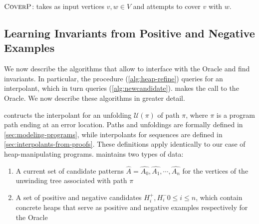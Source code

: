 \begin{algorithm}[ht]


  \caption{$\textsc{CoverP}$: takes as input vertices $v, w \in V$ and attempts to cover $v$ with $w$.}
  \label{alg:heap-cover}
\end{algorithm}

\subsection*{Learning Invariants from Positive and Negative Examples}

We now describe the algorithms that allow \verifier to interface with the Oracle and find invariants. In particular, the  procedure (\autoref{alg:heap-refine}) queries \seplearner for an interpolant, which in turn queries \newcandidate (\autoref{alg:newcandidate}). \newcandidate makes the call to the Oracle. We now describe these algorithms in greater detail.

\seplearner contructs the interpolant for an unfolding $\mathcal{U}(\pi)$ of path $\pi$, where $\pi$ is a program path ending at an error location. Paths and unfoldings are formally defined in \autoref{sec:modeling-programs}, while interpolants for sequences are defined in \autoref{sec:interpolants-from-proofs}. These definitions apply identically to our case of heap-manipulating programs. \seplearner maintains two types of data:

\begin{enumerate}
  \item A current set of candidate patterns $\hat{A} = \hat{A_0}, \hat{A_1}, \cdots, \hat{A_n}$ for the vertices of the unwinding tree associated with path $\pi$
  \item A set of positive and negative candidates $H_i^{+}, H_i^{-} 0 \leq i \leq n$, which contain concrete heaps that serve as positive and negative examples respectively for the Oracle
\end{enumerate}


